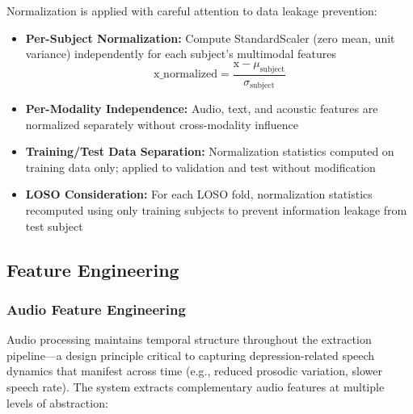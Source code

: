 \documentclass[12pt]{article}
\begin{document}
	Normalization is applied with careful attention to data leakage prevention:

	\begin{itemize}
		\item \textbf{Per-Subject Normalization:} Compute StandardScaler (zero mean, unit variance) independently for each subject's multimodal features
		\begin{equation}
		\text{x\_normalized} = \frac{\text{x} - \mu_{\text{subject}}}{\sigma_{\text{subject}}}
		\end{equation}

		\item \textbf{Per-Modality Independence:} Audio, text, and acoustic features are normalized separately without cross-modality influence

		\item \textbf{Training/Test Data Separation:} Normalization statistics computed on training data only; applied to validation and test without modification

		\item \textbf{LOSO Consideration:} For each LOSO fold, normalization statistics recomputed using only training subjects to prevent information leakage from test subject
	\end{itemize}

	\subsection{Feature Engineering}

	\subsubsection{Audio Feature Engineering}

	Audio processing maintains temporal structure throughout the extraction pipeline—a design principle critical to capturing depression-related speech dynamics that manifest across time (e.g., reduced prosodic variation, slower speech rate). The system extracts complementary audio features at multiple levels of abstraction:
\end{document}
